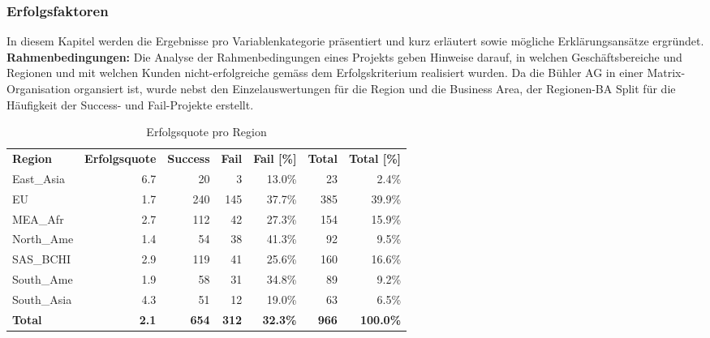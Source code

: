 \subsubsection{Erfolgsfaktoren}
In diesem Kapitel werden die Ergebnisse pro Variablenkategorie präsentiert und kurz erläutert sowie mögliche Erklärungsansätze ergründet.
\newline\newline\textbf{Rahmenbedingungen:} Die Analyse der Rahmenbedingungen eines Projekts geben Hinweise darauf, in welchen Geschäftsbereiche und Regionen und mit welchen Kunden nicht-erfolgreiche gemäss dem Erfolgskriterium realisiert wurden. Da die Bühler AG in einer Matrix-Organisation organsiert ist, wurde nebst den Einzelauswertungen für die Region und die Business Area, der Regionen-BA Split für die Häufigkeit der Success- und Fail-Projekte erstellt.
\begin{table}[htbp]
	\centering
	\caption{Erfolgsquote pro Region}
	\begin{tabular}{lrrrrrr}
		\textbf{Region} & \multicolumn{1}{l}{\textbf{Erfolgsquote}} & \multicolumn{1}{l}{\textbf{Success}} & \multicolumn{1}{l}{\textbf{Fail}} & \multicolumn{1}{l}{\textbf{Fail [\%]}} & \multicolumn{1}{l}{\textbf{Total}} & \multicolumn{1}{l}{\textbf{Total [\%]}} \\
		East\_Asia & 6.7   & 20    & 3     & 13.0\% & 23    & 2.4\% \\
		EU    & 1.7   & 240   & 145   & 37.7\% & 385   & 39.9\% \\
		MEA\_Afr & 2.7   & 112   & 42    & 27.3\% & 154   & 15.9\% \\
		North\_Ame & 1.4   & 54    & 38    & 41.3\% & 92    & 9.5\% \\
		SAS\_BCHI & 2.9   & 119   & 41    & 25.6\% & 160   & 16.6\% \\
		South\_Ame & 1.9   & 58    & 31    & 34.8\% & 89    & 9.2\% \\
		South\_Asia & 4.3   & 51    & 12    & 19.0\% & 63    & 6.5\% \\
		\textbf{Total} & \textbf{2.1} & \textbf{654} & \textbf{312} & \textbf{32.3\%} & \textbf{966} & \textbf{100.0\%} \\
	\end{tabular}%
	\label{tab:addlabel}%
\end{table}%

